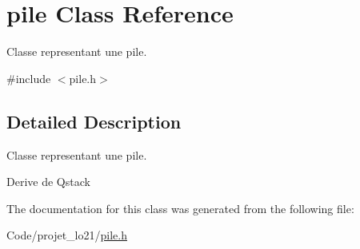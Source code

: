 \hypertarget{classpile}{\section{pile Class Reference}
\label{classpile}
}


Classe representant une pile.  




{\ttfamily \#include $<$pile.\-h$>$}



\subsection{Detailed Description}
Classe representant une pile. 

Derive de Qstack 

The documentation for this class was generated from the following file\-:\begin{DoxyCompactItemize}
\item 
Code/projet\-\_\-lo21/\hyperlink{pile_8h}{pile.\-h}\end{DoxyCompactItemize}
